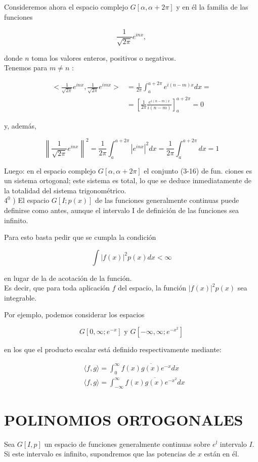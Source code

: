 \documentclass[10pt]{article}
\theoremstyle{plain}
\theoremstyle{definition}
\theoremstyle{remark}
\begin{document}
Consideremos ahora el espacio complejo $G[\alpha, \alpha+2 \pi]$ y en él la familia de las funciones

$$
\frac{1}{\sqrt{2 \pi}} e^{i n x},
$$

donde $n$ toma los valores enteros, positivos o negativos.\\
Tenemos para $m \neq n$ :

$$
\begin{aligned}
<\frac{1}{\sqrt{2 \pi}} e^{i n x}, \frac{1}{\sqrt{2 \pi}} e^{i m x}> & =\frac{1}{2 \pi} \int_{a}^{a+2 \pi} e^{i(n-m) x} d x= \\
& =\left[\frac{1}{2 \pi} \frac{e^{i(n-m) x}}{i(n-m)}\right]_{a}^{a+2 \pi}=0
\end{aligned}
$$


y, además,

$$
\left\|\frac{1}{\sqrt{2 \pi}} e^{i n x}\right\|^{2}=\frac{1}{2 \pi} \int_{a}^{a+2 \pi}\left|e^{i n x}\right|^{2} d x=\frac{1}{2 \pi} \int_{a}^{a+2 \pi} d x=1
$$

Luego: en el espacio complejo $G[\alpha, \alpha+2 \pi]$ el conjunto (3-16) de fun. ciones es un sistema ortogonal; este sistema es total, lo que se deduce inmediatamente de la totalidad del sistema trigonométrico.\\
$4^{0}$ ) El espacio $G[I ; p(x)]$ de las funciones generalmente continuas puede definirse como antes, aunque el intervalo I de definición de las funciones sea infinito.

Para esto basta pedir que se cumpla la condición

$$
\int|f(x)|^{2} p(x) d x<\infty
$$

en lugar de la de acotación de la función.\\
Es decir, que para toda aplicación $f$ del espacio, la función $|f(x)|^{2} p(x)$ sea integrable.

Por ejemplo, podemos considerar los espacios

$$
G\left[0, \infty ; e^{-x}\right] \text { y } G\left[-\infty, \infty ; e^{-x^{2}}\right]
$$

en los que el producto escalar está definido respectivamente mediante:

$$
\begin{aligned}
& \langle f, g\rangle=\int_{0}^{\infty} f(x) \overline{g(x)} e^{-x} d x \\
& \langle f, g\rangle=\int_{-\infty}^{\infty} f(x) \overline{g(x)} e^{-x^{2}} d x
\end{aligned}
$$

\section*{POLINOMIOS ORTOGONALES}
Sea $G[I, p]$ un espacio de funciones generalmente continuas sobre $e^{l}$ intervalo $I$. Si este intervalo es infinito, supondremos que las potencias de $x$ están en él.
\end{document}
